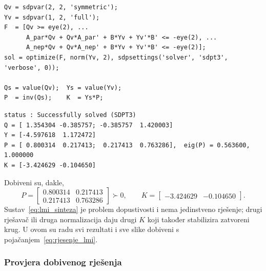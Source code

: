 \begin{lstlisting}
Qv = sdpvar(2, 2, 'symmetric');
Yv = sdpvar(1, 2, 'full');
F  = [Qv >= eye(2), ...
      A_par*Qv + Qv*A_par' + B*Yv + Yv'*B' <= -eye(2), ...
      A_nep*Qv + Qv*A_nep' + B*Yv + Yv'*B' <= -eye(2)];
sol = optimize(F, norm(Yv, 2), sdpsettings('solver', 'sdpt3', 'verbose', 0));

Qs = value(Qv);  Ys = value(Yv);
P  = inv(Qs);    K  = Ys*P;
\end{lstlisting}

\begin{lstlisting}[style=outputstyle]
status : Successfully solved (SDPT3)
Q = [ 1.354304 -0.385757; -0.385757  1.420003]
Y = [-4.597618  1.172472]
P = [ 0.800314  0.217413;  0.217413  0.763286],  eig(P) = 0.563600, 1.000000
K = [-3.424629 -0.104650]
\end{lstlisting}

Dobiveni su, dakle,
\begin{equation}
P = \begin{bmatrix} 0.800314 & 0.217413 \\ 0.217413 & 0.763286 \end{bmatrix} \succ 0, \qquad
K = \begin{bmatrix} -3.424629 & -0.104650 \end{bmatrix}.
\label{eq:rjesenje_lmi}
\end{equation}
Sustav~\eqref{eq:lmi_sinteza} je problem dopustivosti i nema jedinstveno rješenje; drugi rješavač ili druga normalizacija daju drugi $K$ koji također stabilizira zatvoreni krug. U ovom su radu svi rezultati i sve slike dobiveni s pojačanjem~\eqref{eq:rjesenje_lmi}.

\subsubsection{Provjera dobivenog rješenja}


